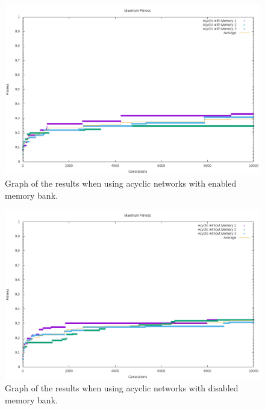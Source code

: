 \begin{figure}[H]
	\includegraphics[width=\textwidth]{figures/acyclicmemory.png}
	\caption{Graph of the results when using acyclic networks with enabled memory bank.}
	\label{experiments:graph:3}
\end{figure}
\begin{figure}[H]
	\includegraphics[width=\textwidth]{figures/acyclicnomemory.png}
	\caption{Graph of the results when using acyclic networks with disabled memory bank.}
	\label{experiments:graph:4}
\end{figure}

